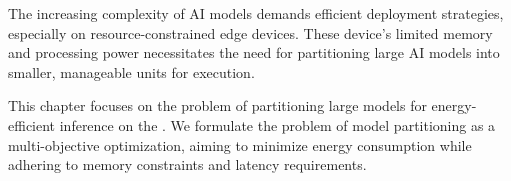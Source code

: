 The increasing complexity of AI models demands efficient deployment strategies, especially on resource-constrained edge devices.
These device's limited memory and processing power necessitates the need for partitioning large AI models into smaller, manageable units for execution.

This chapter focuses on the problem of partitioning large models for energy-efficient inference on the \graicore{}.
We formulate the problem of model partitioning as a multi-objective optimization, aiming to minimize energy consumption while adhering to memory constraints and latency requirements.
